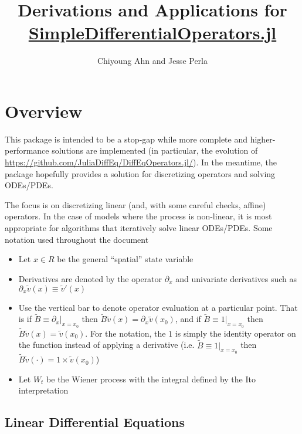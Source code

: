 \documentclass[11pt]{article}
\newcommand{\D}[1][]{\ensuremath{\partial_{#1}}}
\theoremstyle{definition}
\begin{document}
\title{Derivations and Applications for \url{SimpleDifferentialOperators.jl}}
\author{Chiyoung Ahn and Jesse Perla}
\maketitle

\section{Overview}
This package is intended to be a stop-gap while more complete and higher-performance solutions are implemented (in particular, the evolution of \url{https://github.com/JuliaDiffEq/DiffEqOperators.jl/}).  In the meantime, the package hopefully provides a solution for discretizing operators and solving ODEs/PDEs.

The focus is on discretizing linear (and, with some careful checks, affine) operators.  In the case of models where the process is non-linear, it is most appropriate for algorithms that iteratively solve linear ODEs/PDEs.  Some notation used throughout the document
\begin{itemize}
	\item Let $x \in R$ be the general ``spatial'' state  variable

	\item Derivatives are denoted by the operator $\D[x]$ and univariate derivatives such as $\D[x]\tilde{v}(x) \equiv \tilde{v}'(x)$
	\item Use the vertical bar to denote operator evaluation at a particular point.  That is if $\tilde{B} \equiv \partial_x\vert_{x = x_0}$ then $\tilde{B} \tilde{v}(x) = \partial_x \tilde{v}(x_0)$, and if $\tilde{B} \equiv 1 \vert_{x = x_0}$ then $\tilde{B} \tilde{v}(x) = \tilde{v}(x_0)$.  For the notation, the $1$ is simply the identity operator on the function instead of applying a derivative (i.e. $\tilde{B} \equiv 1 \vert_{x = x_0}$ then $\tilde{B} \tilde{v}(\cdot) = 1 \times \tilde{v}(x_0) $)
	\item Let $W_t$ be the Wiener process with the integral defined by the Ito interpretation

\end{itemize}


\subsection{Linear Differential Equations}
\end{document}
